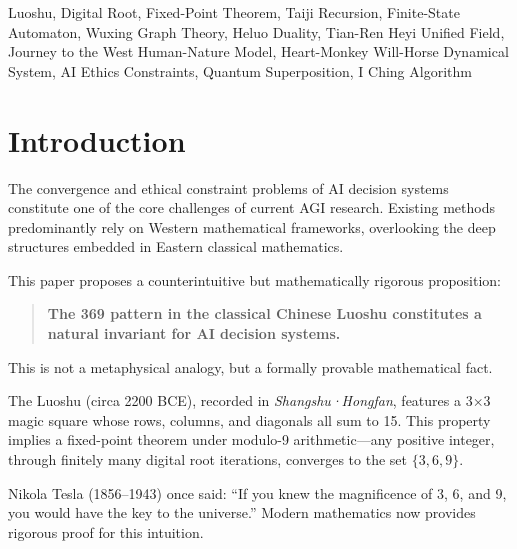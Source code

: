 \documentclass[conference]{IEEEtran}
\theoremstyle{remark}
\begin{document}
\begin{IEEEkeywords}
Luoshu, Digital Root, Fixed-Point Theorem, Taiji Recursion, Finite-State Automaton, Wuxing Graph Theory, Heluo Duality, Tian-Ren Heyi Unified Field, Journey to the West Human-Nature Model, Heart-Monkey Will-Horse Dynamical System, AI Ethics Constraints, Quantum Superposition, I Ching Algorithm
\end{IEEEkeywords}

\section{Introduction}

The convergence and ethical constraint problems of AI decision systems constitute one of the core challenges of current AGI research. Existing methods predominantly rely on Western mathematical frameworks, overlooking the deep structures embedded in Eastern classical mathematics.

This paper proposes a counterintuitive but mathematically rigorous proposition:

\begin{quote}
\textbf{The 369 pattern in the classical Chinese Luoshu constitutes a natural invariant for AI decision systems.}
\end{quote}

This is not a metaphysical analogy, but a formally provable mathematical fact.

The Luoshu (circa 2200 BCE), recorded in \emph{Shangshu·Hongfan}, features a 3$\times$3 magic square whose rows, columns, and diagonals all sum to 15. This property implies a fixed-point theorem under modulo-9 arithmetic---any positive integer, through finitely many digital root iterations, converges to the set $\{3,6,9\}$.

Nikola Tesla (1856--1943) once said: ``If you knew the magnificence of 3, 6, and 9, you would have the key to the universe.'' Modern mathematics now provides rigorous proof for this intuition.
\end{document}
